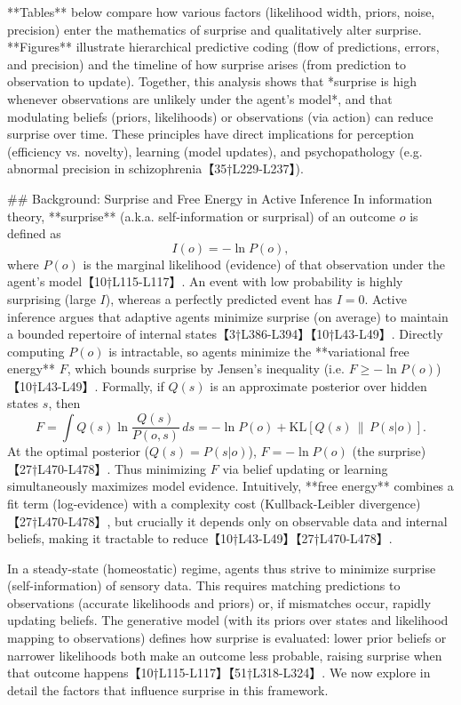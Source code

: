 \documentclass[a4paper]{article}
\begin{document}
    **Tables** below compare how various factors (likelihood width, priors, noise, precision) enter the mathematics of surprise and qualitatively alter surprise.  **Figures** illustrate hierarchical predictive coding (flow of predictions, errors, and precision) and the timeline of how surprise arises (from prediction to observation to update).  Together, this analysis shows that *surprise is high whenever observations are unlikely under the agent’s model*, and that modulating beliefs (priors, likelihoods) or observations (via action) can reduce surprise over time.  These principles have direct implications for perception (efficiency vs. novelty), learning (model updates), and psychopathology (e.g. abnormal precision in schizophrenia【35†L229-L237】).
    
    ## Background: Surprise and Free Energy in Active Inference
    In information theory, **surprise** (a.k.a. self-information or surprisal) of an outcome \(o\) is defined as
    \[
    I(o) = -\ln P(o),
    \]
    where \(P(o)\) is the marginal likelihood (evidence) of that observation under the agent’s model【10†L115-L117】.  An event with low probability is highly surprising (large \(I\)), whereas a perfectly predicted event has \(I=0\).  Active inference argues that adaptive agents minimize surprise (on average) to maintain a bounded repertoire of internal states【3†L386-L394】【10†L43-L49】.  Directly computing \(P(o)\) is intractable, so agents minimize the **variational free energy** \(F\), which bounds surprise by Jensen’s inequality (i.e. \(F \ge -\ln P(o)\))【10†L43-L49】.  Formally, if \(Q(s)\) is an approximate posterior over hidden states \(s\), then
    \[
    F = \int Q(s)\ln\frac{Q(s)}{P(o,s)}\,ds
    = -\ln P(o) + \mathrm{KL}[Q(s)\,\|\,P(s|o)].
    \]
    At the optimal posterior (\(Q(s)=P(s|o)\)), \(F = -\ln P(o)\) (the surprise)【27†L470-L478】.  Thus minimizing \(F\) via belief updating or learning simultaneously maximizes model evidence.  Intuitively, **free energy** combines a fit term (log-evidence) with a complexity cost (Kullback-Leibler divergence)【27†L470-L478】, but crucially it depends only on observable data and internal beliefs, making it tractable to reduce【10†L43-L49】【27†L470-L478】.
    
    In a steady-state (homeostatic) regime, agents thus strive to minimize surprise (self-information) of sensory data.  This requires matching predictions to observations (accurate likelihoods and priors) or, if mismatches occur, rapidly updating beliefs.  The generative model (with its priors over states and likelihood mapping to observations) defines how surprise is evaluated: lower prior beliefs or narrower likelihoods both make an outcome less probable, raising surprise when that outcome happens【10†L115-L117】【51†L318-L324】.  We now explore in detail the factors that influence surprise in this framework.
    
\end{document}
